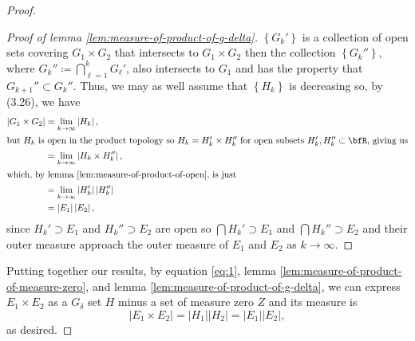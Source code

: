 \begin{proof}
\begin{proof}[Proof of lemma \ref{lem:measure-of-product-of-g-delta}]
$\left\{G_k'\right\}$ is a collection of open sets covering $G_1\times G_2$
that intersects to $G_1\times G_2$ then the collection
$\left\{G_k''\right\}$, where $G_k''\coloneqq\bigcap_{\ell=1}^k G_\ell'$,
also intersects to $G_1$ and has the property that $G_{k+1}''\subset
G_k''$. Thus, we may as well assume that $\left\{H_k\right\}$ is decreasing
so, by (3.26), we have
\begin{align*}
\left|G_1\times G_2\right|
&=\lim_{k\to\infty}\left|H_k\right|,\\
\intertext{but $H_k$ is open in the product topology so $H_k=H_k'\times
  H_k''$ for open subsets $H_k',H_k''\subset\bfR$, giving us}
&=\lim_{k\to\infty}\left|H_k\times H_k''\right|,\\
\intertext{which, by lemma \ref{lem:measure-of-product-of-open}, is just}
&=\lim_{k\to\infty}\left|H_k'\right|\left|H_k''\right|\\
&=\left|E_1\right|\left|E_2\right|,
\end{align*}
since $H_k'\supset E_1$ and $H_k''\supset E_2$ are open so $\bigcap
H_k'\supset E_1$ and $\bigcap H_k''\supset E_2$ and their outer measure
approach the outer measure of $E_1$ and $E_2$ as $k\to\infty$.
\end{proof}
Putting together our results, by equation \ref{eq:1},
lemma \ref{lem:measure-of-product-of-measure-zero}, and
lemma \ref{lem:measure-of-product-of-g-delta}, we can express
$E_1\times E_2$ as a $G_\delta$ set $H$ minus a set of measure zero $Z$
and its measure is
\[
 \left|E_1\times E_2\right|=
\left|H_1\right|\left|H_2\right|=
\left|E_1\right|\left|E_2\right|,
\]
as desired.
\end{proof}
\newpage


